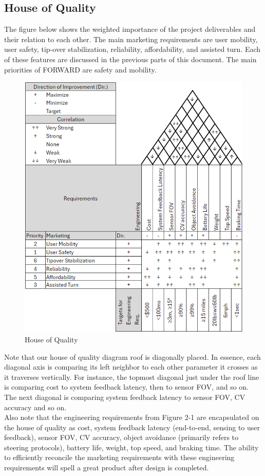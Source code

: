 \subsection{House of Quality}
\indent The figure below shows the weighted importance of the project deliverables and their relation to each other. The main marketing requirements are user mobility, user safety, tip-over stabilization, reliability, affordability, and assisted turn. Each of these features are discussed in the previous parts of this document. The main priorities of FORWARD are safety and mobility. 
\\

\begin{figure}[H]
	\centering
	\includegraphics[width=\textwidth]{./Images/HoQ.png}
	\caption{\label{fig:HoQ}House of Quality}
\end{figure}

\noindent Note that our house of quality diagram roof is diagonally placed. In essence, each diagonal axis is comparing its left neighbor to each other parameter it crosses as it traverses vertically. For instance, the topmost diagonal just under the roof line is comparing cost to system feedback latency, then to sensor FOV, and so on. The next diagonal is comparing system feedback latency to sensor FOV, CV accuracy and so on. 
\\

\noindent
Also note that the engineering requirements from Figure 2-1 are encapsulated on the house of quality as cost, system feedback latency (end-to-end, sensing to user feedback), sensor FOV, CV accuracy, object avoidance (primarily refers to steering protocols), battery life, weight, top speed, and braking time. The ability to efficiently reconcile the marketing requirements with these engineering requirements will spell a great product after design is completed. 
